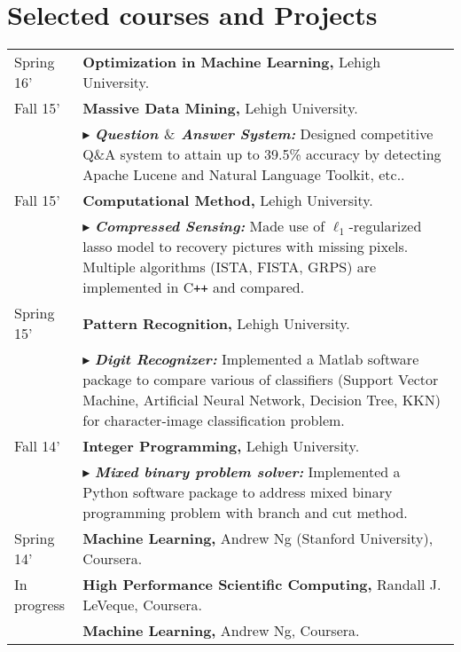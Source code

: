 \documentclass[a4paper,11pt]{article} %
\newcommand{\lst}[1]{\quad\footnotesize{$\blacktriangleright$ #1.}}
\begin{document}
\section{Selected courses and Projects}
\begin{longtable}{>{\centering}p{3.3cm}|p{14cm}}
    Spring 16'& \textbf{Optimization in Machine Learning,} Lehigh University.\\ 
    Fall 15'& \textbf{Massive Data Mining,} Lehigh University.\\ 
    &\lst{\textbf{\emph{Question $\mbox{\&}$ Answer System:}} Designed competitive Q$\mbox{\&}$A system to attain up to 39.5\% accuracy by detecting Apache Lucene and Natural Language Toolkit, etc.}\\
    Fall 15'& \textbf{Computational Method,} Lehigh University.\\ 
    &\lst{\textbf{\emph{Compressed Sensing:}} Made use of $\ell_1$-regularized lasso model to recovery pictures with missing pixels. Multiple algorithms (ISTA, FISTA, GRPS) are implemented in C\texttt{++} and compared}\\   
    Spring 15'& \textbf{Pattern Recognition,} Lehigh University.\\ 
    & \lst{\textbf{\emph{Digit Recognizer:}} Implemented a Matlab software package to compare various of classifiers (Support Vector Machine, Artificial Neural Network, Decision Tree, KKN) for character-image classification problem}\\
    Fall 14'& \textbf{Integer Programming,} Lehigh University.\\ 
    &\lst{\textbf{\emph{Mixed binary problem solver:}} Implemented a Python software package to address mixed binary programming problem with branch and cut method}\\
    Spring 14'& \textbf{Machine Learning,} Andrew Ng (Stanford University), Coursera.\\
    In progress&\textbf{High Performance Scientific Computing,} Randall J. LeVeque, Coursera.\\
    &\textbf{Machine Learning,} Andrew Ng, Coursera.
\end{longtable}
\end{document}
